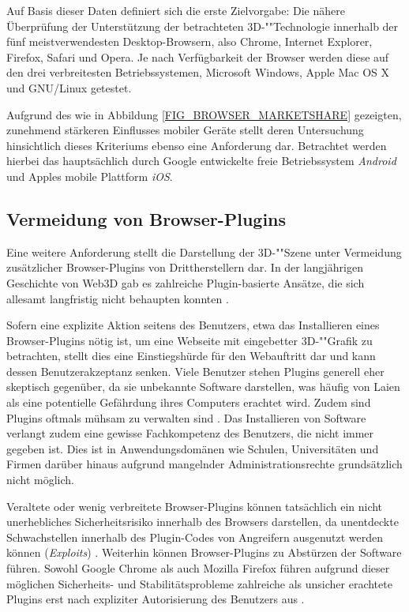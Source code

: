 Auf Basis dieser Daten definiert sich die erste Zielvorgabe: Die nähere Überprüfung der Unterstützung der betrachteten 3D-""Technologie innerhalb der fünf meistverwendesten Desktop-Browsern, also Chrome, Internet Explorer, Firefox, Safari und Opera. Je nach Verfügbarkeit der Browser werden diese auf den drei verbreitesten Betriebssystemen, Microsoft Windows, Apple Mac OS X und GNU/Linux getestet.

Aufgrund des wie in Abbildung \ref{FIG_BROWSER_MARKETSHARE} gezeigten, zunehmend stärkeren Einflusses mobiler Geräte stellt deren Untersuchung hinsichtlich dieses Kriteriums ebenso eine Anforderung dar. Betrachtet werden hierbei das hauptsächlich durch Google entwickelte freie Betriebssystem \emph{Android} und Apples mobile Plattform \emph{iOS}.

\subsection{Vermeidung von Browser-Plugins}
Eine weitere Anforderung stellt die Darstellung der 3D-""Szene unter Vermeidung zusätzlicher Browser-Plugins von Drittherstellern dar. In der langjährigen Geschichte von Web3D gab es zahlreiche Plugin-basierte Ansätze, die sich allesamt langfristig nicht behaupten konnten \autocite{Evans201443}.

Sofern eine explizite Aktion seitens des Benutzers, etwa das Installieren eines Browser-Plugins nötig ist, um eine Webseite mit eingebetter 3D-""Grafik zu betrachten, stellt dies eine Einstiegshürde für den Webauftritt dar und kann dessen Benutzerakzeptanz senken. Viele Benutzer stehen Plugins generell eher skeptisch gegenüber, da sie unbekannte Software darstellen, was häufig von Laien als eine potentielle Gefährdung ihres Computers erachtet wird. Zudem sind Plugins oftmals mühsam zu verwalten sind \autocite{Ortiz:2010}.
Das Installieren von Software verlangt zudem eine gewisse Fachkompetenz des Benutzers, die nicht immer gegeben ist. Dies ist in Anwendungsdomänen wie Schulen, Universitäten und Firmen darüber hinaus aufgrund mangelnder Administrationsrechte grundsätzlich nicht möglich.

Veraltete oder wenig verbreitete Browser-Plugins können tatsächlich ein nicht unerhebliches Sicherheitsrisiko innerhalb des Browsers darstellen, da unentdeckte Schwachstellen innerhalb des Plugin-Codes von Angreifern ausgenutzt werden können (\emph{Exploits}) \autocite{Ortiz:2010}. Weiterhin können Browser-Plugins zu Abstürzen der Software führen. Sowohl Google Chrome als auch Mozilla Firefox führen aufgrund dieser möglichen Sicherheits- und Stabilitätsprobleme zahlreiche als unsicher erachtete Plugins erst nach expliziter Autorisierung des Benutzers aus \autocite{CHROME_BLOCKED_PLUGINS} \autocite{FIREFOX_BLOCKED_PLUGINS}.

